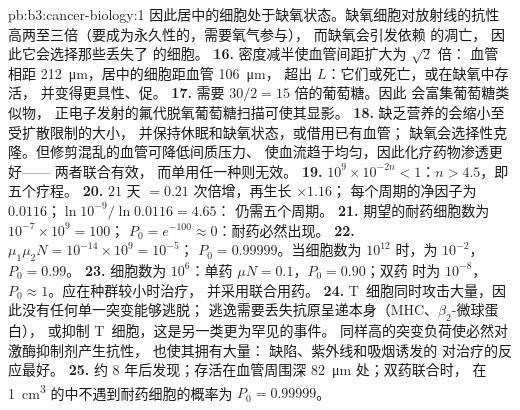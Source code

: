 \begin{solution}{pb:b3:cancer-biology:1}
因此居中的细胞处于缺氧状态。缺氧细胞对放射线的抗性
高两至三倍（要成为永久性的，需要氧气参与），
而缺氧会引发依赖  的凋亡，
因此它会选择那些丢失了  的细胞。
\textbf{16.} 密度减半使血管间距扩大为 $\sqrt{2}$ 倍：
血管相距 \qty{212}{\micro m}，居中的细胞距血管 \qty{106}{\micro m}，
超出 $L$：它们或死亡，或在缺氧中存活，
并变得更具性、促。
\textbf{17.} 需要 $30/2 = 15$ 倍的葡萄糖。因此
会富集葡萄糖类似物，
正电子发射的氟代脱氧葡萄糖扫描可使其显影。
\textbf{18.} 缺乏营养的会缩小至受扩散限制的大小，
并保持休眠和缺氧状态，或借用已有血管；
缺氧会选择性克隆。但修剪混乱的血管可降低间质压力、
使血流趋于均匀，因此化疗药物渗透更好——
两者联合有效，
而单用任一种则无效。
\textbf{19.} $10^{9}\times 10^{-2n} < 1$：$n > 4.5$，即五个疗程。
\textbf{20.} $21$ 天 $= 0.21$ 次倍增，再生长 $\times 1.16$；
每个周期的净因子为 $0.0116$；$\ln 10^{-9}/\ln 0.0116 = 4.65$：
仍需五个周期。
\textbf{21.} 期望的耐药细胞数为 $10^{-7}\times 10^{9} = 100$；
$P_{0} = e^{-100} \approx 0$：耐药必然出现。
\textbf{22.} $\mu_{1}\mu_{2}N = 10^{-14}\times 10^{9} = 10^{-5}$；
$P_{0} = 0.99999$。当细胞数为 $10^{12}$ 时，为 $10^{-2}$，$P_{0} = 0.99$。
\textbf{23.} 细胞数为 $10^{6}$：单药 $\mu N = 0.1$，$P_{0} = 0.90$；双药
时为 $10^{-8}$，$P_{0} \approx 1$。应在种群较小时治疗，
并采用联合用药。
\textbf{24.} T~细胞同时攻击大量，因此没有任何单一突变能够逃脱；
逃逸需要丢失抗原呈递本身（MHC、$\beta_{2}$-微球蛋白），
或抑制 T~细胞，这是另一类更为罕见的事件。
同样高的突变负荷使必然对激酶抑制剂产生抗性，
也使其拥有大量：
缺陷、紫外线和吸烟诱发的
对治疗的反应最好。
\textbf{25.} 约 $8$ 年后发现；存活在血管周围深 \qty{82}{\micro m}
处；双药联合时，
在 \qty{1}{cm^3} 的中不遇到耐药细胞的概率为 $P_{0} = 0.99999$。
\end{solution}
